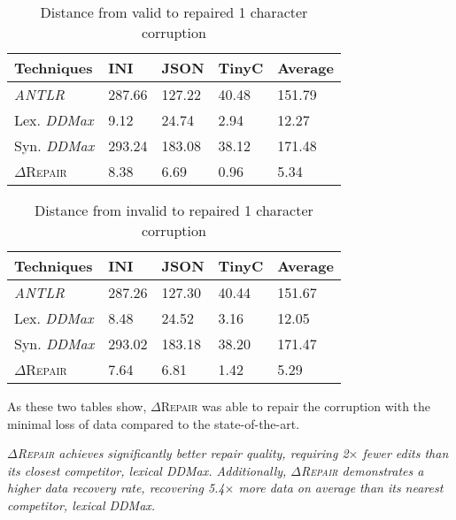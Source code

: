 \documentclass[acmsmall,screen,review,anonymous]{acmart}
\newenvironment{result}{\begin{framed}\centering\it}{\end{framed}}
\newcommand{\approach}{\textsc{$\Delta$Repair}\xspace}
\newcommand{\ANTLR}{\textit{ANTLR}\xspace}
\newcommand{\ddmax}{\textit{DDMax}\xspace}
\newcommand{\drepair}{\approach}
\begin{document}
\begin{table}[!tbp]
\centering
\caption{Distance from valid to repaired 1 character corruption}
\begin{tabular}{|p{4.0cm}|p{1.5cm}|p{1.5cm}|p{1.5cm}|p{1.5cm}|}
\hline
\textbf{Techniques} & \textbf{INI} & \textbf{JSON} & \textbf{TinyC} & \textbf{Average} \\
\hline
\ANTLR & 287.66 & 127.22 & 40.48 & 151.79 \\
Lex. \ddmax & 9.12 & 24.74 & 2.94 & 12.27 \\
Syn. \ddmax & 293.24 & 183.08 & 38.12 & 171.48 \\
\drepair & 8.38 & 6.69 & 0.96 & 5.34 \\
\hline
\end{tabular}
\label{tab:validtorepaired}
\end{table}

\begin{table}[!tbp]
\centering
\caption{Distance from invalid to repaired 1 character corruption}
\begin{tabular}{|p{4.0cm}|p{1.5cm}|p{1.5cm}|p{1.5cm}|p{1.5cm}|}
\hline
\textbf{Techniques} & \textbf{INI} & \textbf{JSON} & \textbf{TinyC} & \textbf{Average} \\
\hline
\ANTLR & 287.26 & 127.30 & 40.44 & 151.67 \\
Lex. \ddmax & 8.48 & 24.52 & 3.16 & 12.05 \\
Syn. \ddmax & 293.02 & 183.18 & 38.20 & 171.47 \\
\drepair & 7.64 & 6.81 & 1.42 & 5.29 \\
\hline
\end{tabular}
\label{tab:invalidtorepaired}
\end{table}

As these two tables show, \drepair was able to repair the corruption with the
minimal loss of data compared to the state-of-the-art.


\begin{result}
\drepair achieves significantly better repair quality, requiring 2$\times$
fewer edits than its closest competitor, lexical \ddmax.
Additionally, \drepair demonstrates a higher data recovery rate, recovering
5.4$\times$ more data on average than its nearest competitor, lexical \ddmax.
\end{result}
\end{document}
